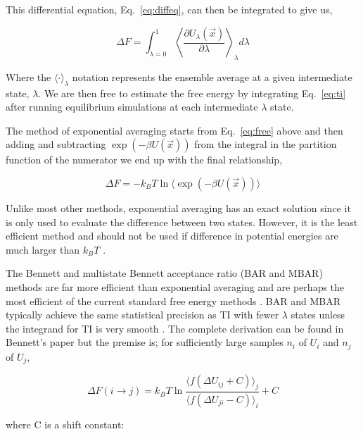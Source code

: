 This differential equation, Eq.\ \ref{eq:diffeq}, can then be integrated to give us,

\begin{equation}\label{eq:ti}
    \Delta F = \int_{\lambda = 0}^{1} \left< \frac{\partial U_{\lambda}(\vec{x})}{\partial \lambda} \right>_{\lambda} d\lambda
\end{equation}

Where the $\langle \cdot \rangle_{\lambda}$ notation represents the ensemble average at a given intermediate state, $\lambda$. We are then free to estimate the free energy by integrating Eq.\ \ref{eq:ti} after running equilibrium simulations at each intermediate $\lambda$ state.

The method of exponential averaging \cite{Zwanzig1954} starts from Eq.\ \ref{eq:free} above and then adding and subtracting $\exp{(-\beta U(\vec{x}))}$ from the integral in the partition function of the numerator we end up with the final relationship,

\begin{equation}\label{eq:exp}
    \Delta F = -k_{B}T \ln \langle \exp{(-\beta U(\vec{x}))} \rangle
\end{equation}

Unlike most other methods, exponential averaging has an exact solution since it is only used to evaluate the difference between two states. However, it is the least efficient method and should not be used if difference in potential energies are much larger than $k_{B}T$ \cite{Shirts2005}.

The Bennett \cite{Bennett1976} and multistate \cite{Shirts2008} Bennett acceptance ratio (BAR and MBAR) methods are far more efficient than exponential averaging and are perhaps the most efficient of the current standard free energy methods \cite{Shirts2005, Ytreberg2006}. BAR and MBAR typically achieve the same statistical precision as TI with fewer $\lambda$ states unless the integrand for TI is very smooth \cite{Monticelli2013, Ytreberg2006}. The complete derivation can be found in Bennett's paper \cite{Bennett1976} but the premise is; for sufficiently large samples $n_{i}$ of $U_{i}$ and $n_{j}$ of $U_{j}$,

\begin{equation}\label{eq:bar}
    \Delta F(i \rightarrow j) = k_{B}T \ln{\frac{\langle f(\Delta U_{ij} + C) \rangle_{j}}{\langle f(\Delta U_{ji} - C) \rangle_{i}}} + C 
\end{equation}

where C is a shift constant:

